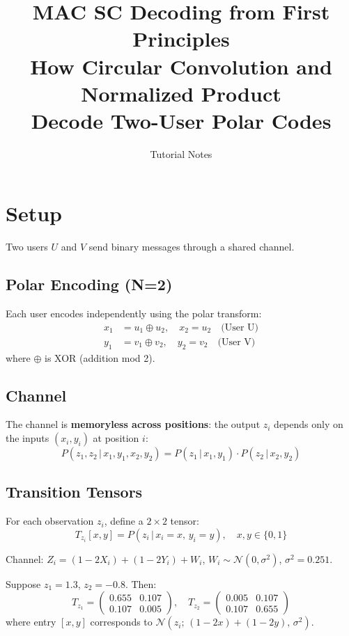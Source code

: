 \documentclass[11pt,a4paper]{article}
\title{\textbf{MAC SC Decoding from First Principles}\\[5pt]
\large How Circular Convolution and Normalized Product\\Decode Two-User Polar Codes}
\author{Tutorial Notes}
\date{}
\begin{document}
\maketitle
\thispagestyle{empty}

\section{Setup}

Two users $U$ and $V$ send binary messages through a shared channel.

\subsection{Polar Encoding (N=2)}
Each user encodes independently using the polar transform:
\begin{align}
x_1 &= u_1 \oplus u_2, \quad x_2 = u_2 \quad \text{(User U)} \\
y_1 &= v_1 \oplus v_2, \quad y_2 = v_2 \quad \text{(User V)}
\end{align}
where $\oplus$ is XOR (addition mod 2).

\subsection{Channel}
The channel is \textbf{memoryless across positions}: the output $z_i$ depends only on the inputs $(x_i, y_i)$ at position $i$:
\[
P(z_1, z_2 \,|\, x_1, y_1, x_2, y_2) = P(z_1 \,|\, x_1, y_1) \cdot P(z_2 \,|\, x_2, y_2)
\]

\subsection{Transition Tensors}
For each observation $z_i$, define a $2\times 2$ tensor:
\[
T_{z_i}[x, y] = P(z_i \,|\, x_i = x,\, y_i = y), \quad x,y \in \{0,1\}
\]

\begin{tcolorbox}[colback=blue!5,colframe=convblue,title=Example: GMAC at SNR = 6\,dB]
Channel: $Z_i = (1-2X_i) + (1-2Y_i) + W_i$, \; $W_i \sim \mathcal{N}(0, \sigma^2)$, \; $\sigma^2 = 0.251$.

Suppose $z_1 = 1.3$, $z_2 = -0.8$. Then:
\[
T_{z_1} = \begin{pmatrix} 0.655 & 0.107 \\ 0.107 & 0.005 \end{pmatrix}, \quad
T_{z_2} = \begin{pmatrix} 0.005 & 0.107 \\ 0.107 & 0.655 \end{pmatrix}
\]
where entry $[x,y]$ corresponds to $\mathcal{N}(z_i;\, (1\!-\!2x)+(1\!-\!2y),\, \sigma^2)$.
\end{tcolorbox}
\end{document}
